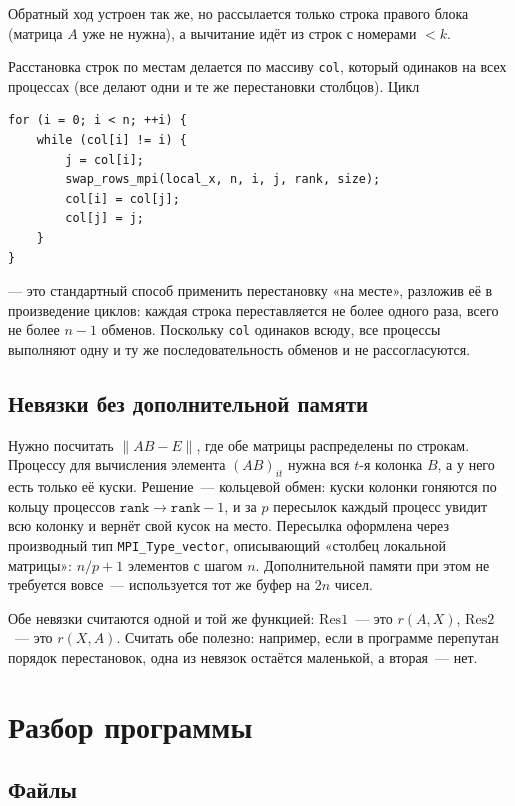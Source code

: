 \documentclass[11pt,a4paper]{report}
\begin{document}
Обратный ход устроен так же, но рассылается только строка правого блока
(матрица $A$ уже не нужна), а вычитание идёт из строк с номерами $<k$.

Расстановка строк по местам делается по массиву \texttt{col}, который одинаков
на всех процессах (все делают одни и те же перестановки столбцов). Цикл
\begin{lstlisting}[style=c]
for (i = 0; i < n; ++i) {
    while (col[i] != i) {
        j = col[i];
        swap_rows_mpi(local_x, n, i, j, rank, size);
        col[i] = col[j];
        col[j] = j;
    }
}
\end{lstlisting}
--- это стандартный способ применить перестановку «на месте», разложив её в
произведение циклов: каждая строка переставляется не более одного раза, всего
не более $n-1$ обменов. Поскольку \texttt{col} одинаков всюду, все процессы
выполняют одну и ту же последовательность обменов и не рассогласуются.

\subsection{Невязки без дополнительной памяти}

Нужно посчитать $\|AB-E\|$, где обе матрицы распределены по строкам. Процессу
для вычисления элемента $(AB)_{it}$ нужна вся $t$-я колонка $B$, а у него есть
только её куски. Решение~--- кольцевой обмен: куски колонки гоняются по кольцу
процессов $\texttt{rank}\to\texttt{rank}-1$, и за $p$ пересылок каждый процесс
увидит всю колонку и вернёт свой кусок на место. Пересылка оформлена через
производный тип \texttt{MPI\_Type\_vector}, описывающий «столбец локальной
матрицы»: $n/p+1$ элементов с шагом $n$. Дополнительной памяти при этом не
требуется вовсе~--- используется тот же буфер на $2n$ чисел.

Обе невязки считаются одной и той же функцией: $\mathrm{Res1}$~--- это
$r(A,X)$, $\mathrm{Res2}$~--- это $r(X,A)$. Считать обе полезно: например,
если в программе перепутан порядок перестановок, одна из невязок остаётся
маленькой, а вторая~--- нет.

\section{Разбор программы}

\subsection{Файлы}
\end{document}
